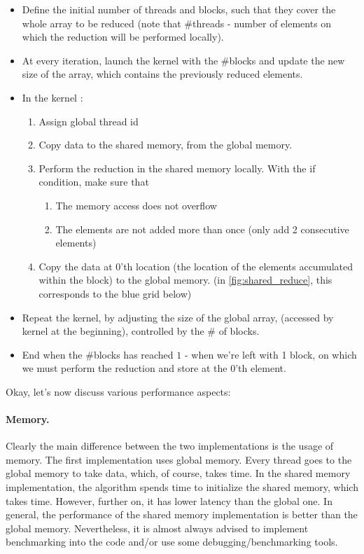\documentclass[12pt]{article}
\begin{document}
 \begin{itemize}
   \setlength\itemsep{-0.5em}
    \item Define the initial number of threads and blocks, such that they cover the whole 
    array to be reduced (note that \#threads - number of elements on which the reduction will be performed locally).
    \item At every iteration, launch the kernel with the \#blocks and update the new size of the array, which 
    contains the previously reduced elements. 
    \item In the kernel : \begin{enumerate}
                           \setlength\itemsep{-0.2em}
                        \item Assign global thread id
                        \item Copy data to the shared memory, from the global memory.
                        \item Perform the reduction in the shared memory locally. With the if condition, make sure that 
                        \begin{enumerate}
                           \setlength\itemsep{-0.2em}
                           \item The memory access does not overflow
                           \item The elements are not added more than once (only add 2 consecutive elements)
                        \end{enumerate}
                        \item Copy the data at 0'th location (the location of the elements accumulated within the block) to the global memory.
                        (in \autoref{fig:shared_reduce}, this corresponds to the blue grid below)
                        
                        \end{enumerate} 
   \item Repeat the kernel, by adjusting the size of the global array, (accessed by kernel at the beginning), 
   controlled by the \# of blocks. 
   \item End when the \#blocks has reached $1$ - when we're left with 1 block, on which we must 
   perform the reduction and store at the 0'th element.
\end{itemize}

Okay, let's now discuss various performance aspects:
\paragraph*{Memory.}Clearly the main difference between the two implementations is 
the usage of memory. The first implementation uses global memory. Every thread goes to 
the global memory to take data, which, of course, takes time. In the shared memory implementation,
the algorithm spends time to initialize the shared memory, which takes time. However, further on, it has lower latency than 
the global one. In general, the performance of the shared memory implementation is better than the global memory. 
Nevertheless, it is almost always advised to implement benchmarking into the code and/or use some 
debugging/benchmarking tools.
\end{document}
